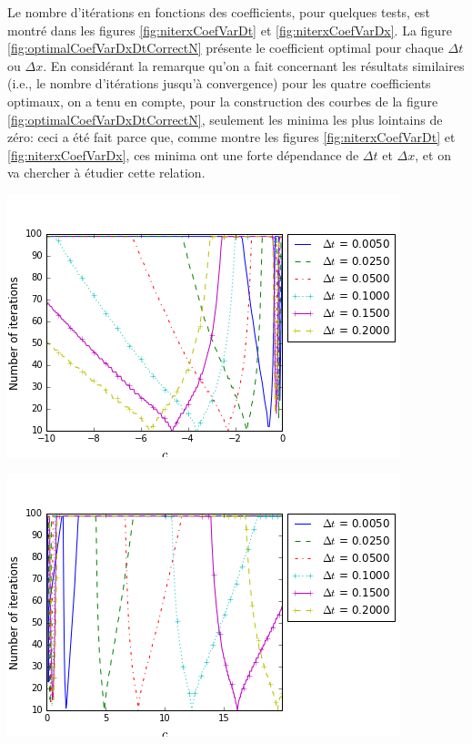 \indent Le nombre d'itérations en fonctions des coefficients, pour quelques tests, est montré dans les figures \ref{fig:niterxCoefVarDt} et \ref{fig:niterxCoefVarDx}. La figure \ref{fig:optimalCoefVarDxDtCorrectN} présente le coefficient optimal pour chaque $\Delta t$ ou $\Delta x$. En considérant la remarque qu'on a fait concernant les résultats similaires (i.e., le nombre d'itérations jusqu'à convergence) pour les quatre coefficients optimaux, on a tenu en compte, pour la construction des courbes de la figure \ref{fig:optimalCoefVarDxDtCorrectN}, seulement les minima les plus lointains de zéro: ceci a été fait parce que, comme montre les figures \ref{fig:niterxCoefVarDt} et \ref{fig:niterxCoefVarDx}, ces minima ont une forte dépendance de $\Delta t$ et $\Delta x$, et on va chercher à étudier cette relation.

\begingroup
\noindent
\begin{minipage}{.45\linewidth}
	\includegraphics[scale=.45]{figures/FinalFigures/NiterxCoefVarDtdx250FinalVersionNMarshal.png}
\end{minipage}
\hfill
\begin{minipage}{.45\linewidth}
	\includegraphics[scale=.45]{figures/FinalFigures/NiterxCoefVarDtdx250FinalVersionPMarshal.png}
\end{minipage}
\endgroup

